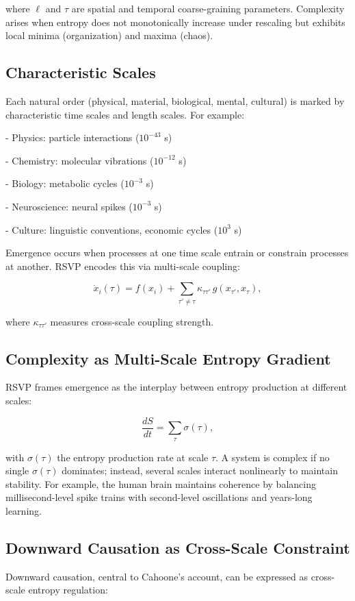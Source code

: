 \documentclass[12pt]{book}
\begin{document}
where \( \ell \) and \( \tau \) are spatial and temporal coarse-graining parameters. Complexity arises when entropy does not monotonically increase under rescaling but exhibits local minima (organization) and maxima (chaos).

\subsection{Characteristic Scales}
Each natural order (physical, material, biological, mental, cultural) is marked by characteristic time scales and length scales. For example:

- Physics: particle interactions (\( 10^{-43} \) s)

- Chemistry: molecular vibrations (\( 10^{-12} \) s)

- Biology: metabolic cycles (\( 10^{-3} \) s)

- Neuroscience: neural spikes (\( 10^{-3} \) s)

- Culture: linguistic conventions, economic cycles (\( 10^{3} \) s)

Emergence occurs when processes at one time scale entrain or constrain processes at another. RSVP encodes this via multi-scale coupling:

\[ \dot{x}_i(\tau) = f(x_i) + \sum_{\tau' \neq \tau} \kappa_{\tau \tau'} \, g(x_{\tau'}, x_\tau), \]

where \( \kappa_{\tau \tau'} \) measures cross-scale coupling strength.

\subsection{Complexity as Multi-Scale Entropy Gradient}
RSVP frames emergence as the interplay between entropy production at different scales:

\[ \frac{dS}{dt} = \sum_{\tau} \sigma(\tau), \]

with \( \sigma(\tau) \) the entropy production rate at scale \( \tau \). A system is complex if no single \( \sigma(\tau) \) dominates; instead, several scales interact nonlinearly to maintain stability. For example, the human brain maintains coherence by balancing millisecond-level spike trains with second-level oscillations and years-long learning.

\subsection{Downward Causation as Cross-Scale Constraint}
Downward causation, central to Cahoone’s account, can be expressed as cross-scale entropy regulation:
\end{document}
